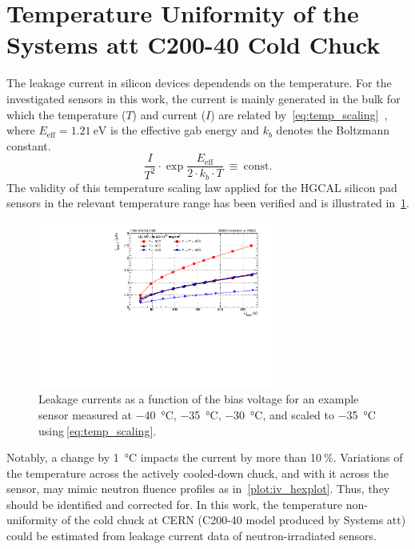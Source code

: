 \section{Temperature Uniformity of the Systems att C200-40 Cold Chuck}
\label{appendix:chuck_temp}
The leakage current in silicon devices dependends on the temperature.
For the investigated sensors in this work, the current is mainly generated in the bulk for which the temperature ($T$) and current ($I$) are related by~\ref{eq:temp_scaling}~\cite{Chilingarov_2013}, where $E_\text{eff}=\SI{1.21}{\electronvolt}$ is the effective gab energy and $k_b$ denotes the Boltzmann constant.
\begin{equation}
    \frac{I}{T^2}\cdot \exp{\frac{E_\text{eff}}{2\cdot k_b \cdot T}}~\equiv~\text{const.}
    \label{eq:temp_scaling}
\end{equation}
The validity of this temperature scaling law applied for the HGCAL silicon pad sensors in the relevant temperature range has been verified and is illustrated in~\ref{plot:iv_tempscaling}.
\begin{figure}
	\centering
	\includegraphics[width=0.69\textwidth]{plots/iv_temp_scaling/iv_overlay_ch24.pdf}
	\caption{
		Leakage currents as a function of the bias voltage for an example sensor measured at \SI{-40}{\celsius}, \SI{-35}{\celsius}, \SI{-30}{\celsius}, and scaled to \SI{-35}{\celsius} using$~$\ref{eq:temp_scaling}.
		}
	\label{plot:iv_tempscaling}
	\end{figure}
Notably, a change by \SI{1}{\celsius} impacts the current by more than 10$~\%$. 
Variations of the temperature across the actively cooled-down chuck, and with it across the sensor, may mimic neutron fluence profiles as in~\ref{plot:iv_hexplot}. 
Thus, they should be identified and corrected for.%
In this work, the temperature non-uniformity of the cold chuck at CERN (C200-40 model produced by Systems att) could be estimated from leakage current data of neutron-irradiated sensors.

